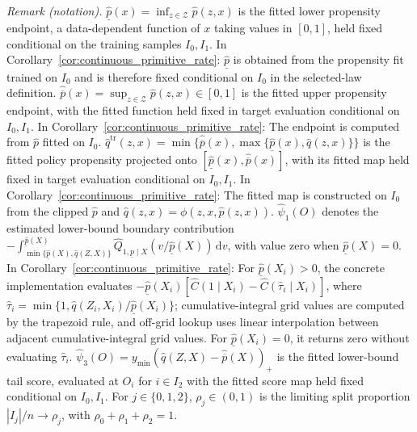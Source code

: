 \noindent\textit{Remark (notation).} $\hat{\underline p}(x)=\inf_{z\in\mathcal Z}\hat p(z,x)$ is the fitted lower propensity endpoint, a data-dependent function of $x$ taking values in $[0,1]$, held fixed conditional on the training samples $I_0,I_1$. In Corollary~\ref{cor:continuous_primitive_rate}: $\hat{\underline p}$ is obtained from the propensity fit trained on $I_0$ and is therefore fixed conditional on $I_0$ in the selected-law definition. $\hat{\overline p}(x)=\sup_{z\in\mathcal Z}\hat p(z,x)\in[0,1]$ is the fitted upper propensity endpoint, with the fitted function held fixed in target evaluation conditional on $I_0,I_1$. In Corollary~\ref{cor:continuous_primitive_rate}: The endpoint is computed from $\hat p$ fitted on $I_0$. $\hat q^{\mathrm{tr}}(z,x)=\min\{\hat{\overline p}(x),\max\{\hat{\underline p}(x),\hat q(z,x)\}\}$ is the fitted policy propensity projected onto $[\hat{\underline p}(x),\hat{\overline p}(x)]$, with its fitted map held fixed in target evaluation conditional on $I_0,I_1$. In Corollary~\ref{cor:continuous_primitive_rate}: The fitted map is constructed on $I_0$ from the clipped $\hat p$ and $\hat q(z,x)=\phi(z,x,\hat p(z,x))$. $\hat\psi_1(O)$ denotes the estimated lower-bound boundary contribution $-\int_{\min\{\hat{\underline p}(X),\hat q(Z,X)\}}^{\hat{\underline p}(X)}\widehat Q_{1,\underline p\mid X}(v/\hat{\underline p}(X))\,\mathrm dv$, with value zero when $\hat{\underline p}(X)=0$. In Corollary~\ref{cor:continuous_primitive_rate}: For $\hat{\underline p}(X_i)>0$, the concrete implementation evaluates $-\hat{\underline p}(X_i)[\widehat C(1\mid X_i)-\widehat C(\hat\tau_i\mid X_i)]$, where $\hat\tau_i=\min\{1,\hat q(Z_i,X_i)/\hat{\underline p}(X_i)\}$; cumulative-integral grid values are computed by the trapezoid rule, and off-grid lookup uses linear interpolation between adjacent cumulative-integral grid values. For $\hat{\underline p}(X_i)=0$, it returns zero without evaluating $\hat\tau_i$. $\hat\psi_3(O)=y_{\min}(\hat q(Z,X)-\hat{\overline p}(X))_+$ is the fitted lower-bound tail score, evaluated at $O_i$ for $i\in I_2$ with the fitted score map held fixed conditional on $I_0,I_1$. For $j\in\{0,1,2\}$, $\rho_j\in(0,1)$ is the limiting split proportion $|I_j|/n\to\rho_j$, with $\rho_0+\rho_1+\rho_2=1$.


